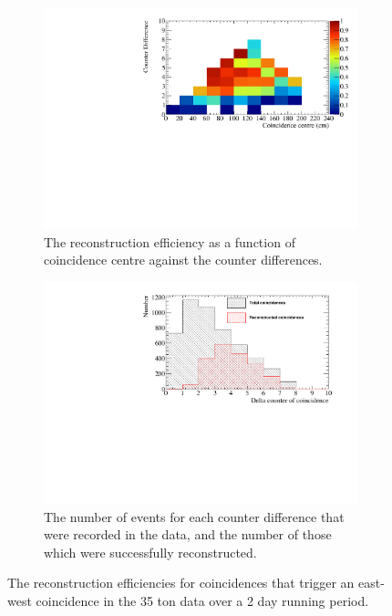 \begin{figure}
  \begin{subfigure}{0.48\textwidth}
    \centering
    \includegraphics[width=\textwidth]{TwoDimensional_50cm}
    \caption{The reconstruction efficiency as a function of coincidence centre against the counter differences.}
    \label{fig:TwoDimCanvas}
  \end{subfigure}%
  \hspace{0.03\textwidth}%
  \begin{subfigure}{0.48\textwidth}
    \centering
    \includegraphics[width=\textwidth]{CounterDiffCan}
    \caption{The number of events for each counter difference that were recorded in the data, and the number of those which were successfully reconstructed.}
    \label{fig:CounterDiffFreq}
  \end{subfigure}
  \caption[Reconstruction efficiencies of through going tracks in the 35 ton data]
          {The reconstruction efficiencies for coincidences that trigger an east-west coincidence in the 35 ton data over a 2 day running period.}
  \label{fig:DataRecoEffics}
\end{figure}
    
